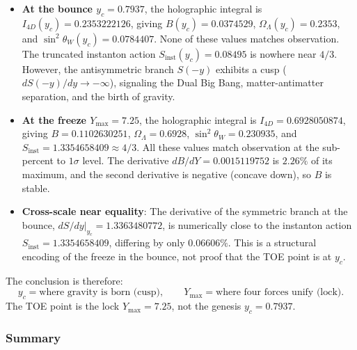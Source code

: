 \documentclass[a4paper,1pt,oneside,openany]{book}
\begin{document}
\begin{itemize}
\item \textbf{At the bounce $y_c = 0.7937$}, the holographic integral is $I_{4D}(y_c) = 0.2353222126$, giving $B(y_c) = 0.0374529$, $\Omega_\Lambda(y_c) = 0.2353$, and $\sin^2\theta_W(y_c) = 0.0784407$. None of these values matches observation. The truncated instanton action $S_{\mathrm{inst}}(y_c) = 0.08495$ is nowhere near $4/3$. However, the antisymmetric branch $S(-y)$ exhibits a cusp ($dS(-y)/dy \to -\infty$), signaling the Dual Big Bang, matter-antimatter separation, and the birth of gravity.

\item \textbf{At the freeze $Y_{\max} = 7.25$}, the holographic integral is $I_{4D} = 0.6928050874$, giving $B = 0.1102630251$, $\Omega_\Lambda = 0.6928$, $\sin^2\theta_W = 0.230935$, and $S_{\mathrm{inst}} = 1.3354658409 \approx 4/3$. All these values match observation at the sub-percent to $1\sigma$ level. The derivative $dB/dY = 0.0015119752$ is $2.26\%$ of its maximum, and the second derivative is negative (concave down), so $B$ is stable.

\item \textbf{Cross-scale near equality}: The derivative of the symmetric branch at the bounce, $dS/dy|_{y_c} = 1.3363480772$, is numerically close to the instanton action $S_{\mathrm{inst}} = 1.3354658409$, differing by only $0.06606\%$. This is a structural encoding of the freeze in the bounce, not proof that the TOE point is at $y_c$.
\end{itemize}

The conclusion is therefore:
\begin{equation}
\boxed{y_c = \text{where gravity is born (cusp)}, \qquad Y_{\max} = \text{where four forces unify (lock)}.}
\label{eq:genesis-lock-table}
\end{equation}
The TOE point is the lock $Y_{\max} = 7.25$, not the genesis $y_c = 0.7937$.

\subsubsection{Summary}
\end{document}
